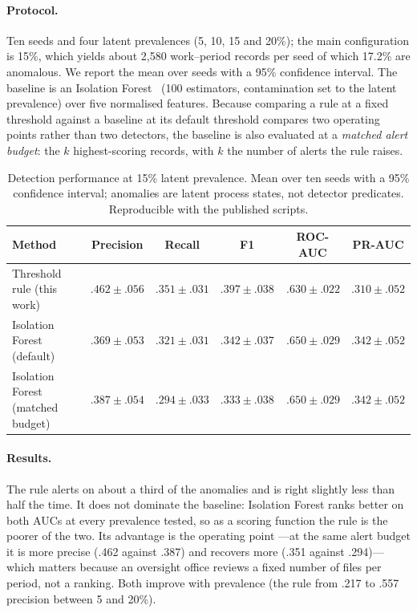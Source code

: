 \documentclass[runningheads]{llncs}
\renewcommand{\_}{\origunderscore\allowbreak}
\begin{document}
\paragraph{Protocol.} Ten seeds and four latent prevalences (5, 10, 15 and
20\%); the main configuration is 15\%, which yields about 2,580 work--period
records per seed of which 17.2\% are anomalous. We report the mean over seeds
with a 95\% confidence interval. The baseline is an Isolation
Forest~\cite{Liu2008} (100 estimators, contamination set to the latent
prevalence) over five normalised features. Because comparing a rule at a fixed
threshold against a baseline at its default threshold compares two operating
points rather than two detectors, the baseline is also evaluated at a
\emph{matched alert budget}: the $k$ highest-scoring records, with $k$ the
number of alerts the rule raises.

\begin{table}[htbp]
\centering
\caption{Detection performance at 15\% latent prevalence. Mean over ten seeds
with a 95\% confidence interval; anomalies are latent process states, not
detector predicates. Reproducible with the published scripts.}
\label{tab:eval-deteccion-anomalias}
\scriptsize
\setlength{\tabcolsep}{4pt}
\renewcommand{\arraystretch}{1.15}
\begin{tabular}{l r r r r r}
\toprule
\textbf{Method} &
\multicolumn{1}{c}{\textbf{Precision}} &
\multicolumn{1}{c}{\textbf{Recall}} &
\multicolumn{1}{c}{\textbf{F1}} &
\multicolumn{1}{c}{\textbf{ROC-AUC}} &
\multicolumn{1}{c}{\textbf{PR-AUC}} \\
\midrule
Threshold rule (this work)        & $.462 \pm .056$ & $.351 \pm .031$ & $.397 \pm .038$ & $.630 \pm .022$ & $.310 \pm .052$ \\
Isolation Forest (default)        & $.369 \pm .053$ & $.321 \pm .031$ & $.342 \pm .037$ & $.650 \pm .029$ & $.342 \pm .052$ \\
Isolation Forest (matched budget) & $.387 \pm .054$ & $.294 \pm .033$ & $.333 \pm .038$ & $.650 \pm .029$ & $.342 \pm .052$ \\
\bottomrule
\end{tabular}
\end{table}

\paragraph{Results.} The rule alerts on about a third of the
anomalies and is right slightly less than half the time. It does not dominate
the baseline: Isolation Forest ranks better on both AUCs at every prevalence
tested, so as a scoring function the rule is the poorer of the two. Its
advantage is the operating point ---at the same alert budget it is more precise
(.462 against .387) and recovers more (.351 against .294)--- which matters
because an oversight office reviews a fixed number of files per period, not a
ranking. Both improve with prevalence (the rule from .217 to .557 precision
between 5 and 20\%).
\end{document}
